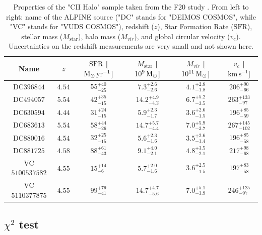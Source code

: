 \begin{table}
\centering
%
\begin{tabular}{ c c c c c c }
\hline
Name   & $z$    & $\mathrm{SFR}$ [${\rm M}_{\odot}\,\mathrm{yr}^{-1}$]   & $M_\mathrm{star}$ [$10^{9}\,{\rm M}_{\odot}$]    & $M_{vir}$ [$10^{11}\,{\rm M}_{\odot}$]     & $v_c$ [$\mathrm{km}\,\mathrm{s}^{-1}$] \\ 
\hline
\hline
DC$396844$    &    $4.54$    &    $55^{+40}_{-25}$    &   $7.3^{+2.6}_{-2.6}$   &   $4.1^{+2.8}_{-1.8}$    &   $206^{+90}_{-66}$ \\
DC$494057$   & $5.54$   &    $42^{+35}_{-15}$    &   $14.2^{+4.9}_{-4.2}$   &   $6.7^{+5.2}_{-3.5}$    &   $263^{+133}_{-97}$\\
DC$630594$    &    $4.44$    &    $31^{+24}_{-15}$    &   $5.9^{+2.3}_{-1.7}$   &   $3.6^{+2.6}_{-1.5}$    &   $196^{+85}_{-59}$ \\
DC$683613$    &    $5.54$    &    $58^{+44}_{-26}$    &   $14.7^{+5.7}_{-4.4}$   &   $7.0^{+5.9}_{-3.7}$    &   $267^{+145}_{-102}$ \\
DC$880016$    &    $4.54$    &    $32^{+25}_{-15}$    &   $5.6^{+2.3}_{-1.6}$  &   $3.5^{+2.6}_{-1.4}$    &   $196^{+85}_{-58}$ \\
DC$881725$    &    $4.58$    &    $88^{+61}_{-43}$    &   $9.1^{+4.0}_{-2.1}$   &   $4.8^{+3.5}_{-2.1}$    &   $217^{+98}_{-68}$  \\
VC$5100537582$    &    $4.55$    &   $15^{+14}_{-6}$    &   $5.7^{+2.0}_{-1.6}$  &   $ 3.6^{+2.5}_{-1.5}$    &   $197^{+83}_{-58}$ \\
VC$5110377875$    &    $4.55$    &    $99^{+79}_{-41}$    &   $14.7^{+4.7}_{-5.6}$   &   $7.0^{+5.1}_{-3.9}$    &   $246^{+125}_{-97}$ \\
 \hline
\end{tabular}
%
\caption{Properties of the "CII Halo" sample taken from the F20 study \citep{Fujimoto:2020qzo}. From left to right: name of the ALPINE source ("DC" stands for "DEIMOS COSMOS", while "VC" stands for "VUDS COSMOS"), redshift ($z$), Star Formation Rate ($\mathrm{SFR}$), stellar mass ($M_\mathrm{star}$), halo mass ($M_{vir}$), and global circular velocity ($v_c$). Uncertainties on the redshift measurements are very small and not shown here. 
\label{tab:alpine_sample}
}
\end{table}

\subsection{$\chi^2$ test} \label{sec:chi2}

